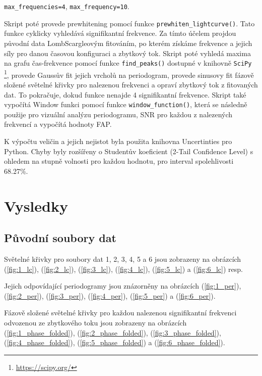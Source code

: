 \documentclass[a4paper,11pt,twocolumn]{article}
\begin{document}
            \begin{center}
                \texttt{max\_frequencies=4}, \texttt{max\_frequency=10}.
            \end{center}

            Skript poté provede prewhitening pomocí funkce \texttt{prewhiten\_lightcurve()}. Tato funkce cyklicky vyhledává signifikantní frekvence. Za tímto účelem projdou původní data LombScargleovým fitováním, po kterém získáme frekvence a jejich síly pro danou časovou konfiguraci a zbytkový tok. Skript poté vyhledá maxima na grafu čas-frekvence pomocí funkce \texttt{find\_peaks()} dostupné v knihovně \texttt{SciPy} \footnote{\url{https://scipy.org/}}, provede Gaussův fit jejich vrcholů na periodogram, provede sinusovy fit fázově složené světelné křivky pro nalezenou frekvenci a opraví zbytkový tok z fitovaných dat. To pokračuje, dokud funkce nenajde 4 signifikantní frekvence. Skript také vypočítá Window funkci pomocí funkce \texttt{window\_function()}, která se následně použije pro vizuální analýzu periodogramu, SNR pro každou z nalezených frekvencí a vypočítá hodnoty FAP. 
            
            K výpočtu veličin a jejich nejistot byla použita knihovna Uncertinties pro Python. Chyby byly rozšířeny o Studentův koeficient (2-Tail Confidence Level) s ohledem na stupně volnosti pro každou hodnotu, pro interval spolehlivosti 68.27\%.

    \section{Vysledky}
        \subsection{Původní soubory dat}
            Světelné křivky pro soubory dat 1, 2, 3, 4, 5 a 6 jsou zobrazeny na obrázcích (\ref{fig:1_lc}), (\ref{fig:2_lc}), (\ref{fig:3_lc}), (\ref{fig:4_lc}), (\ref{fig:5_lc}) a (\ref{fig:6_lc}) resp. 
            
            Jejich odpovídající periodogramy jsou znázorněny na obrázcích (\ref{fig:1_per}), (\ref{fig:2_per}), (\ref{fig:3_per}), (\ref{fig:4_per}), (\ref{fig:5_per}) a (\ref{fig:6_per}). 

            Fázově složené světelné křivky pro každou nalezenou signifikantní frekvenci odvozenou ze zbytkového toku jsou zobrazeny na obrázcích (\ref{fig:1_phase_folded}), (\ref{fig:2_phase_folded}), (\ref{fig:3_phase_folded}), (\ref{fig:4_phase_folded}), (\ref{fig:5_phase_folded}) a (\ref{fig:6_phase_folded}).
\end{document}
